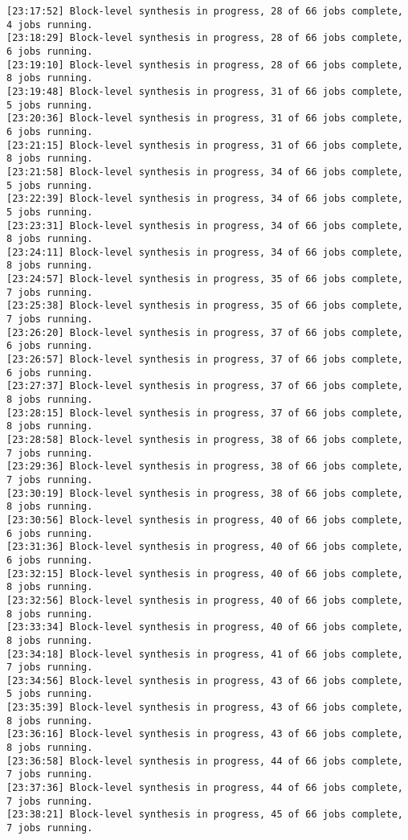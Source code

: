 \begin{lstlisting}[label=lst:code_2,caption=Содержимое файла  v++*.log]
[23:17:52] Block-level synthesis in progress, 28 of 66 jobs complete, 4 jobs running.
[23:18:29] Block-level synthesis in progress, 28 of 66 jobs complete, 6 jobs running.
[23:19:10] Block-level synthesis in progress, 28 of 66 jobs complete, 8 jobs running.
[23:19:48] Block-level synthesis in progress, 31 of 66 jobs complete, 5 jobs running.
[23:20:36] Block-level synthesis in progress, 31 of 66 jobs complete, 6 jobs running.
[23:21:15] Block-level synthesis in progress, 31 of 66 jobs complete, 8 jobs running.
[23:21:58] Block-level synthesis in progress, 34 of 66 jobs complete, 5 jobs running.
[23:22:39] Block-level synthesis in progress, 34 of 66 jobs complete, 5 jobs running.
[23:23:31] Block-level synthesis in progress, 34 of 66 jobs complete, 8 jobs running.
[23:24:11] Block-level synthesis in progress, 34 of 66 jobs complete, 8 jobs running.
[23:24:57] Block-level synthesis in progress, 35 of 66 jobs complete, 7 jobs running.
[23:25:38] Block-level synthesis in progress, 35 of 66 jobs complete, 7 jobs running.
[23:26:20] Block-level synthesis in progress, 37 of 66 jobs complete, 6 jobs running.
[23:26:57] Block-level synthesis in progress, 37 of 66 jobs complete, 6 jobs running.
[23:27:37] Block-level synthesis in progress, 37 of 66 jobs complete, 8 jobs running.
[23:28:15] Block-level synthesis in progress, 37 of 66 jobs complete, 8 jobs running.
[23:28:58] Block-level synthesis in progress, 38 of 66 jobs complete, 7 jobs running.
[23:29:36] Block-level synthesis in progress, 38 of 66 jobs complete, 7 jobs running.
[23:30:19] Block-level synthesis in progress, 38 of 66 jobs complete, 8 jobs running.
[23:30:56] Block-level synthesis in progress, 40 of 66 jobs complete, 6 jobs running.
[23:31:36] Block-level synthesis in progress, 40 of 66 jobs complete, 6 jobs running.
[23:32:15] Block-level synthesis in progress, 40 of 66 jobs complete, 8 jobs running.
[23:32:56] Block-level synthesis in progress, 40 of 66 jobs complete, 8 jobs running.
[23:33:34] Block-level synthesis in progress, 40 of 66 jobs complete, 8 jobs running.
[23:34:18] Block-level synthesis in progress, 41 of 66 jobs complete, 7 jobs running.
[23:34:56] Block-level synthesis in progress, 43 of 66 jobs complete, 5 jobs running.
[23:35:39] Block-level synthesis in progress, 43 of 66 jobs complete, 8 jobs running.
[23:36:16] Block-level synthesis in progress, 43 of 66 jobs complete, 8 jobs running.
[23:36:58] Block-level synthesis in progress, 44 of 66 jobs complete, 7 jobs running.
[23:37:36] Block-level synthesis in progress, 44 of 66 jobs complete, 7 jobs running.
[23:38:21] Block-level synthesis in progress, 45 of 66 jobs complete, 7 jobs running.

\end{lstlisting}
